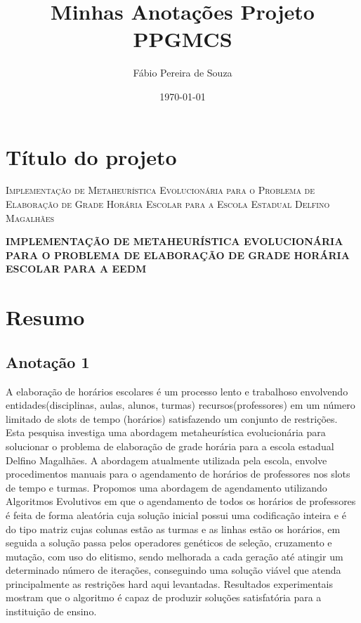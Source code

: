 \documentclass[12pt, a4paper, fleqn, titlepage, onecolumn, abntex2]{article}
\author{Fábio Pereira de Souza}
\title{Minhas Anotações Projeto PPGMCS}
\date{\today}
\begin{document}
\maketitle

\section{Título do projeto}

\begin{center}
\textsc{Implementação de Metaheurística Evolucionária
para o Problema de Elaboração de Grade Horária
Escolar para a Escola Estadual Delfino
Magalhães}
\end{center}

\begin{center}
\textbf{IMPLEMENTAÇÃO DE METAHEURÍSTICA EVOLUCIONÁRIA PARA O PROBLEMA DE ELABORAÇÃO DE GRADE HORÁRIA ESCOLAR PARA A EEDM}
\end{center}

\section{Resumo}

\subsection{Anotação 1}

A elaboração de horários escolares é um processo lento e trabalhoso envolvendo entidades(disciplinas, aulas, alunos, turmas) recursos(professores) em um número limitado de slots de tempo (horários) satisfazendo um conjunto de restrições. Esta pesquisa investiga uma abordagem metaheurística evolucionária para solucionar o problema de elaboração de grade horária para a escola estadual Delfino Magalhães. A abordagem atualmente utilizada pela escola, envolve procedimentos manuais para o agendamento de horários de professores nos slots de tempo e turmas. Propomos uma abordagem de agendamento utilizando Algoritmos Evolutivos em que o agendamento de todos os horários de professores é feita de forma aleatória cuja solução inicial possui uma codificação inteira e é do tipo matriz cujas colunas estão as turmas e as linhas estão os horários, em seguida a solução passa pelos operadores genéticos de seleção, cruzamento e mutação, com uso do elitismo, sendo melhorada a cada geração até atingir um determinado número de iterações, conseguindo uma solução viável que atenda principalmente as restrições hard aqui levantadas. Resultados experimentais mostram que o algoritmo é capaz de produzir soluções satisfatória para a instituição de ensino.
\end{document}
